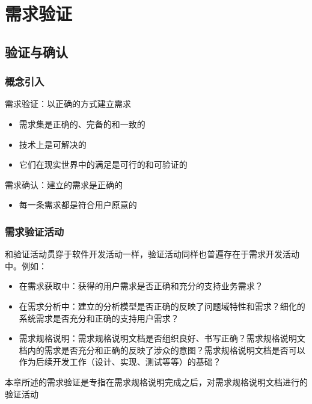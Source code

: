 \section{需求验证}

\subsection{验证与确认}

\subsubsection{概念引入}
需求验证：以正确的方式建立需求
\vspace{-0.8em}
\begin{multicols}{2}
    \begin{itemize}
        \item 需求集是正确的、完备的和一致的
        \item 技术上是可解决的
        \item 它们在现实世界中的满足是可行的和可验证的
    \end{itemize}
\end{multicols}
\vspace{-1em}

需求确认：建立的需求是正确的
\begin{itemize}
    \item 每一条需求都是符合用户原意的
\end{itemize}

\subsubsection{需求验证活动}
和验证活动贯穿于软件开发活动一样，验证活动同样也普遍存在于需求开发活动中。例如：
\begin{itemize}
    \item 在需求获取中：获得的用户需求是否正确和充分的支持业务需求？
    \item 在需求分析中：建立的分析模型是否正确的反映了问题域特性和需求？细化的系统需求是否充分和正确的支持用户需求？
    \item 需求规格说明：需求规格说明文档是否组织良好、书写正确？需求规格说明文档内的需求是否充分和正确的反映了涉众的意图？需求规格说明文档是否可以作为后续开发工作（设计、实现、测试等等）的基础？ 
\end{itemize}

本章所述的需求验证是专指在需求规格说明完成之后，对需求规格说明文档进行的验证活动

